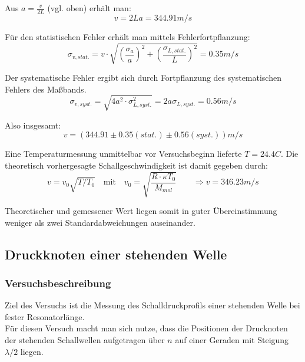 \documentclass[12pt,a4paper]{article}
\begin{document}
Aus $a=\frac{v}{2L}$ (vgl. oben) erhält man:
\begin{equation}
v=2La=344.91 m/s
\end{equation}

Für den statistischen Fehler erhält man mittels Fehlerfortpflanzung:
\begin{equation}
\sigma_{v,stat.}=v \cdot \sqrt{(\frac{\sigma_a}{a})^2+		(\frac{\sigma_{L,stat.}}{L})^2}=0.35 m/s
\end{equation}

Der systematische Fehler ergibt sich durch Fortpflanzung des systematischen Fehlers des Maßbands.
\begin{equation}
\sigma_{v,syst.}=\sqrt{4a^2 \cdot \sigma_{L,syst.}^2}		=2a \sigma_{L,syst.}=0.56 m/s
\end{equation}

Also insgesamt:
\begin{equation}
v=(344.91 \pm 0.35(stat.) \pm 0.56(syst.))m/s
\end{equation}

Eine Temperaturmessung unmittelbar vor Versuchsbeginn lieferte $T=24.4 C$. Die theoretisch vorhergesagte Schallgeschwindigkeit ist damit gegeben durch:
\begin{equation}
v=v_0 \sqrt{T/T_0} \quad \text{mit} \quad v_0=\sqrt{\frac{R \cdot \kappa T_0}			{M_{mol}}}
\qquad
\Rightarrow v=346.23 m/s
\end{equation}

Theoretischer und gemessener Wert liegen somit in guter Übereinstimmung weniger als zwei Standardabweichungen auseinander.




\subsection{Druckknoten einer stehenden Welle}

\subsubsection{Versuchsbeschreibung}
Ziel des Versuchs ist die Messung des Schalldruckprofils einer stehenden Welle bei fester Resonatorlänge.\\
Für diesen Versuch macht man sich nutze, dass die Positionen der Drucknoten der stehenden Schallwellen aufgetragen über $n$ auf einer Geraden mit Steigung  $\lambda/2$ liegen.
\end{document}
